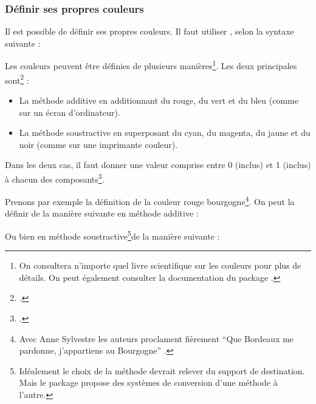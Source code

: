\subsubsection{Définir ses propres couleurs}

Il est possible de définir ses propres couleurs. Il faut  utiliser , selon la syntaxe suivante : 



Les couleurs peuvent être définies de plusieurs manières\footnote{On consultera n'importe quel livre scientifique sur les couleurs pour plus de détails. On peut également consulter la documentation du package .}. Les deux principales sont\footcite[Il existe aussi la méthode de définition par la longueur d'onde pour les couleurs de l'arc en ciel, par pourcentage de gris pour les différents niveaux de gris, ainsi que par teinte, saturation et luminosité, mais ceci nécessiterait un cours de physique lumineuse. Pour  les personnes intéressées par les détails, consulter][]{xcolor_methode} :
\begin{itemize}
\item La méthode additive en additionnant du rouge, du vert et du bleu (comme sur un écran d'ordinateur).
\item La méthode soustractive en superposant du cyan, du magenta, du jaune et du noir (comme sur une imprimante couleur).
\end{itemize}


Dans les deux cas, il faut  donner une valeur comprise entre 0 (inclus) et 1 (inclus) à chacun des composants\footcite[On pourra trouver une série de code couleur sur le site][]{codecouleur}.



Prenons par exemple la définition de la couleur \textcolor{rougebourgogne}{rouge bourgogne}\footnote{Avec Anne Sylvestre les auteurs proclament fièrement \enquote{Que Bordeaux me pardonne, j’appartiens au Bourgogne} \parencite{romaneconti}.}.
On peut la définir de la manière suivante en méthode additive :

\begin{latexcode}
\end{latexcode}

Ou bien en méthode soustractive\footnote{Idéalement le choix de  la méthode devrait relever du support de destination. Mais le package  propose des systèmes de conversion d'une méthode à l'autre.}de la manière suivante :

